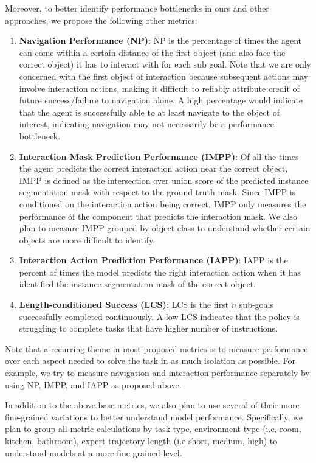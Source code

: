 \documentclass[11pt,a4paper]{article}
\begin{document}
Moreover, to better identify performance bottlenecks in ours and other approaches, we propose the following other metrics:

\begin{enumerate}
    \item \textbf{Navigation Performance (NP)}: NP is the percentage of times the agent can come within a certain distance of the first object (and also face the correct object) it has to interact with for each sub goal. Note that we are only concerned with the first object of interaction because subsequent actions may involve interaction actions, making it difficult to reliably attribute credit of future success/failure to navigation alone. A high percentage would indicate that the agent is successfully able to at least navigate to the object of interest, indicating navigation may not necessarily be a performance bottleneck.
    \item \textbf{Interaction Mask Prediction Performance (IMPP)}: Of all the times the agent predicts the correct interaction action near the correct object, IMPP is defined as the intersection over union score of the predicted instance segmentation mask with respect to the ground truth mask. Since IMPP is conditioned on the interaction action being correct, IMPP only measures the performance of the component that predicts the interaction mask. We also plan to measure IMPP grouped by object class to understand whether certain objects are more difficult to identify.
    \item \textbf{Interaction Action Prediction Performance (IAPP)}: IAPP is the percent of times the model predicts the right interaction action when it has identified the instance segmentation mask of the correct object.
    \item \textbf{Length-conditioned Success (LCS)}: LCS is the first $n$ sub-goals successfully completed continuously. A low LCS indicates that the policy is struggling to complete tasks that have higher number of instructions.
\end{enumerate}

Note that a recurring theme in most proposed metrics is to measure performance over each aspect needed to solve the task in as much isolation as possible. For example, we try to measure navigation and interaction performance separately by using NP, IMPP, and IAPP as proposed above.

In addition to the above base metrics, we also plan to use several of their more fine-grained variations to better understand model performance. Specifically, we plan to group all metric calculations by task type, environment type (i.e. room, kitchen, bathroom), expert trajectory length (i.e short, medium, high) to understand models at a more fine-grained level.
\end{document}

